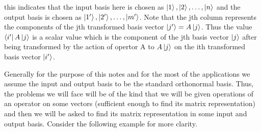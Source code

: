 this indicates that the input basis here is chosen as $\ket{1},\ket{2},\ldots,\ket{n}$ and the output basis is chosen as $\ket{1'},\ket{2'},\ldots,\ket{m'}$.
Note that the jth column represents the components of the jth transformed basis vector $\ket{j'}=A\ket{j}$. 
Thus the value $\bra{i'}A\ket{j}$ is a scalar value which is the component of the jth basis vector $\ket{j}$ after being transformed by the action of opertor 
A to $A\ket{j}$ on the ith transformed basis vector $\ket{i'}$.

Generally for the purpose of this notes and for the most of the applications we assume the input and output basis to 
be the standard orthonormal basis. Thus, the problems we will face will be of the kind that we will be given operations of 
an operator on some vectors (sufficient enough to find its matrix representation) and then 
we will be asked to find its matrix representation in some input and output basis. Consider the following example for more
clarity.

